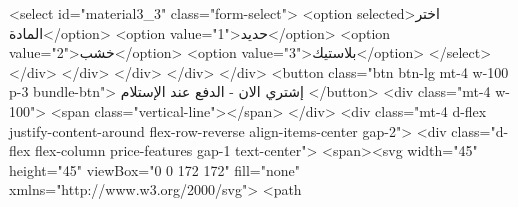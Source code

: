                       <select id="material3_3" class="form-select">
                        <option selected>اختر المادة</option>
                        <option value="1">حديد</option>
                        <option value="2">خشب</option>
                        <option value="3">بلاستيك</option>
                      </select>
                    </div>
                  </div>
                </div>
              </div>
            </div>
            <button class="btn btn-lg mt-4 w-100 p-3 bundle-btn">
              إشتري الان - الدفع عند الإستلام
            </button>
            <div class="mt-4 w-100">
              <span class="vertical-line"></span>
            </div>
            <div class="mt-4 d-flex justify-content-around flex-row-reverse align-items-center gap-2">
              <div class="d-flex flex-column price-features gap-1 text-center">
                <span><svg width="45" height="45" viewBox="0 0 172 172" fill="none"
                    xmlns="http://www.w3.org/2000/svg">
                    <path
